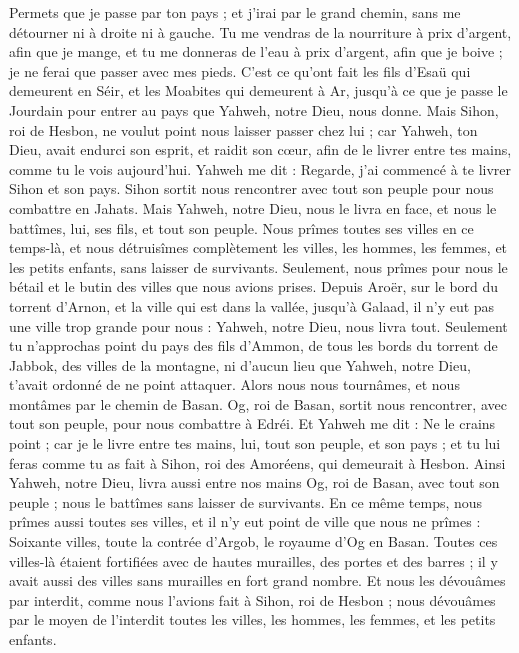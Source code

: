 \begin{multicols}{2}
Permets que je passe par ton pays ; et j’irai par le grand chemin, sans me détourner ni à droite ni à gauche.
Tu me vendras de la nourriture à prix d’argent, afin que je mange, et tu me donneras de l’eau à prix d’argent, afin que je boive ; je ne ferai que passer avec mes pieds.
C’est ce qu'ont fait les fils d'Esaü qui demeurent en Séir, et les Moabites qui demeurent à Ar, jusqu'à ce que je passe le Jourdain pour entrer au pays que Yahweh, notre Dieu, nous donne.
Mais Sihon, roi de Hesbon, ne voulut point nous laisser passer chez lui ; car Yahweh, ton Dieu, avait endurci son esprit, et raidit son cœur, afin de le livrer entre tes mains, comme tu le vois aujourd'hui.
Yahweh me dit : Regarde, j'ai commencé à te livrer Sihon et son pays.
Sihon sortit nous rencontrer avec tout son peuple pour nous combattre en Jahats.
Mais Yahweh, notre Dieu, nous le livra en face, et nous le battîmes, lui, ses fils, et tout son peuple.
Nous prîmes toutes ses villes en ce temps-là, et nous détruisîmes complètement les villes, les hommes, les femmes, et les petits enfants, sans laisser de survivants.
Seulement, nous prîmes pour nous le bétail et le butin des villes que nous avions prises.
Depuis Aroër, sur le bord du torrent d'Arnon, et la ville qui est dans la vallée, jusqu'à Galaad, il n'y eut pas une ville trop grande pour nous : Yahweh, notre Dieu, nous livra tout.
Seulement tu n’approchas point du pays des fils d’Ammon, de tous les bords du torrent de Jabbok, des villes de la montagne, ni d'aucun lieu que Yahweh, notre Dieu, t’avait ordonné de ne point attaquer.
\VerseOne{}Alors nous nous tournâmes, et nous montâmes par le chemin de Basan. Og, roi de Basan, sortit nous rencontrer, avec tout son peuple, pour nous combattre à Edréi.
Et Yahweh me dit : Ne le crains point ; car je le livre entre tes mains, lui, tout son peuple, et son pays ; et tu lui feras comme tu as fait à Sihon, roi des Amoréens, qui demeurait à Hesbon.
Ainsi Yahweh, notre Dieu, livra aussi entre nos mains Og, roi de Basan, avec tout son peuple ; nous le battîmes sans laisser de survivants.
En ce même temps, nous prîmes aussi toutes ses villes, et il n'y eut point de ville que nous ne prîmes : Soixante villes, toute la contrée d'Argob, le royaume d'Og en Basan.
Toutes ces villes-là étaient fortifiées avec de hautes murailles, des portes et des barres ; il y avait aussi des villes sans murailles en fort grand nombre.
Et nous les dévouâmes par interdit, comme nous l’avions fait à Sihon, roi de Hesbon ; nous dévouâmes par le moyen de l'interdit toutes les villes, les hommes, les femmes, et les petits enfants.

\end{multicols}
